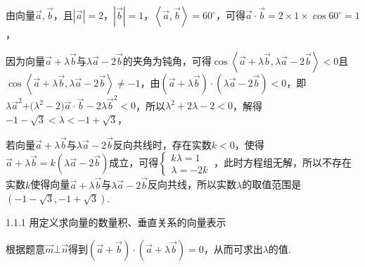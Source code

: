 由向量\(\overrightarrow{a},\overrightarrow{b}\)，且\(\left| \overrightarrow{a} \right| = 2\)，\(\left| \overrightarrow{b} \right| = 1\)，\(\left\langle \overrightarrow{a},\overrightarrow{b} \right\rangle = 60^{\circ}\)，可得\(\overrightarrow{a} \cdot \overrightarrow{b} = 2 \times 1 \times \cos 60^{\circ} = 1\)，

因为向量\(\overrightarrow{a} + \lambda\overrightarrow{b}\)与\(\lambda\overrightarrow{a} - 2\overrightarrow{b}\)的夹角为钝角，可得\(\cos\left\langle \overrightarrow{a} + \lambda\overrightarrow{b},\lambda\overrightarrow{a} - 2\overrightarrow{b} \right\rangle < 0\)且\(\cos\left\langle \overrightarrow{a} + \lambda\overrightarrow{b},\lambda\overrightarrow{a} - 2\overrightarrow{b} \right\rangle \neq - 1\)，由\(\left( \overrightarrow{a} + \lambda\overrightarrow{b} \right) \cdot \allowbreak\left( \lambda\overrightarrow{a} - 2\overrightarrow{b} \right) < 0\)，即\(\lambda{\overrightarrow{a}}^{2}\text{+(}\lambda^{2} - 2)\overrightarrow{a} \cdot \overrightarrow{b} - 2\lambda{\overrightarrow{b}}^{2} < 0\)，所以\(\lambda^{2} + 2\lambda - 2 < 0\)，解得\(- 1 - \sqrt{3} < \lambda < - 1 + \sqrt{3}\)，

若向量\(\overrightarrow{a} + \lambda\overrightarrow{b}\)与\(\lambda\overrightarrow{a} - 2\overrightarrow{b}\)反向共线时，存在实数\(k < 0\)，使得\(\overrightarrow{a} + \lambda\overrightarrow{b} = k(\lambda\overrightarrow{a} - 2\overrightarrow{b})\)成立，可得\(\left\{ \begin{array}{r}
k\lambda = 1 \\
\lambda = - 2k
\end{array} \right.\ \)，此时方程组无解，所以不存在实数\(k\)使得向量\(\overrightarrow{a} + \lambda\overrightarrow{b}\)与\(\lambda\overrightarrow{a} - 2\overrightarrow{b}\)反向共线，所以实数\(\lambda\)的取值范围是\(\left( - 1 - \sqrt{3}, - 1 + \sqrt{3} \right)\).


\noindent\hangindent=7mm\quad{}1.1.1 用定义求向量的数量积、垂直关系的向量表示

根据题意\(\overrightarrow{m}\bot\overrightarrow{n}\)得到\(\left( \overrightarrow{a} + \overrightarrow{b} \right) \cdot \allowbreak\left( \overrightarrow{a} + \lambda\overrightarrow{b} \right) = 0\)，从而可求出\(\lambda\)的值.

